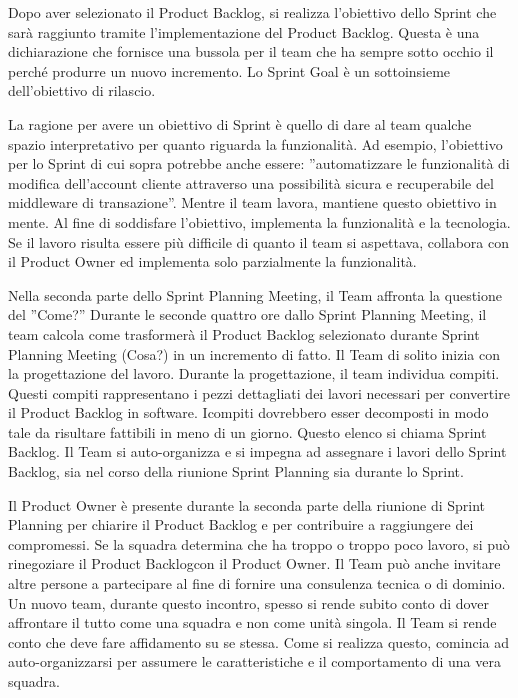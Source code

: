 Dopo aver selezionato il Product Backlog, si realizza l'obiettivo dello Sprint che sar\`a raggiunto tramite l'implementazione del Product
Backlog. Questa \`e una dichiarazione che fornisce una bussola per il team che ha sempre sotto occhio il perch\'e produrre un nuovo
incremento. Lo Sprint Goal \`e un sottoinsieme dell'obiettivo di rilascio.
\newline

La ragione per avere un obiettivo di Sprint \`e quello di dare al team qualche spazio interpretativo per quanto riguarda la
funzionalit\`a. Ad esempio, l'obiettivo per lo Sprint di cui sopra potrebbe anche essere: ''automatizzare le funzionalit\`a di modifica
dell'account cliente attraverso una possibilit\`a sicura e recuperabile del middleware di transazione''. Mentre il team lavora, mantiene
questo obiettivo in mente. Al fine di soddisfare l'obiettivo, implementa la funzionalit\`a e la tecnologia. Se il lavoro risulta essere
pi\`u difficile di quanto il team si aspettava, collabora con il Product Owner ed implementa solo parzialmente la funzionalit\`a.
\newline

Nella seconda parte dello Sprint Planning Meeting, il Team affronta la questione del ''Come?'' Durante le seconde quattro ore dallo
Sprint Planning Meeting, il team calcola come trasformer\`a il Product Backlog selezionato durante Sprint Planning Meeting (Cosa?) in un
incremento di fatto. Il Team di solito inizia con la progettazione del lavoro. Durante la progettazione, il team individua compiti.
Questi compiti rappresentano i pezzi dettagliati dei lavori necessari per convertire il Product Backlog in software. Icompiti dovrebbero
esser decomposti in modo tale da risultare fattibili in meno di un giorno. Questo elenco si chiama Sprint Backlog. Il Team si
auto-organizza e si impegna ad assegnare i lavori dello Sprint Backlog, sia nel corso della riunione Sprint Planning sia durante lo
Sprint.
\newline

Il Product Owner \`e presente durante la seconda parte della riunione di Sprint Planning per chiarire il Product Backlog e per
contribuire a raggiungere dei compromessi. Se la squadra determina che ha troppo o troppo poco lavoro, si pu\`o rinegoziare il Product
Backlogcon il Product Owner. Il Team pu\`o anche invitare altre persone a partecipare al fine di fornire una consulenza tecnica o di
dominio. Un nuovo team, durante questo incontro, spesso si rende subito conto di dover affrontare il tutto come una squadra e non come
unit\`a singola. Il Team si rende conto che deve fare affidamento su se stessa. Come si realizza questo, comincia ad auto-organizzarsi
per assumere le caratteristiche e il comportamento di una vera squadra.

